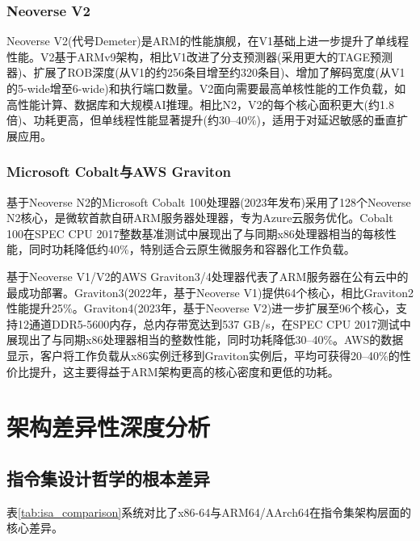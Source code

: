 \documentclass[12pt,a4paper]{IEEEtran}
\begin{document}
\subsubsection{Neoverse V2}

Neoverse V2(代号Demeter)是ARM的性能旗舰，在V1基础上进一步提升了单线程性能。V2基于ARMv9架构，相比V1改进了分支预测器(采用更大的TAGE预测器)、扩展了ROB深度(从V1的约256条目增至约320条目)、增加了解码宽度(从V1的5-wide增至6-wide)和执行端口数量。V2面向需要最高单核性能的工作负载，如高性能计算、数据库和大规模AI推理。相比N2，V2的每个核心面积更大(约1.8倍)、功耗更高，但单线程性能显著提升(约30--40\%)，适用于对延迟敏感的垂直扩展应用。

\subsubsection{Microsoft Cobalt与AWS Graviton}

基于Neoverse N2的Microsoft Cobalt 100处理器(2023年发布)采用了128个Neoverse N2核心，是微软首款自研ARM服务器处理器，专为Azure云服务优化。Cobalt 100在SPEC CPU 2017整数基准测试中展现出了与同期x86处理器相当的每核性能，同时功耗降低约40\%，特别适合云原生微服务和容器化工作负载。

基于Neoverse V1/V2的AWS Graviton3/4处理器代表了ARM服务器在公有云中的最成功部署。Graviton3(2022年，基于Neoverse V1)提供64个核心，相比Graviton2性能提升25\%。Graviton4(2023年，基于Neoverse V2)进一步扩展至96个核心，支持12通道DDR5-5600内存，总内存带宽达到537 GB/s，在SPEC CPU 2017测试中展现出了与同期x86处理器相当的整数性能，同时功耗降低30--40\%\cite{aws2023graviton4}。AWS的数据显示，客户将工作负载从x86实例迁移到Graviton实例后，平均可获得20--40\%的性价比提升，这主要得益于ARM架构更高的核心密度和更低的功耗。

\section{架构差异性深度分析}

\subsection{指令集设计哲学的根本差异}

表\ref{tab:isa_comparison}系统对比了x86-64与ARM64/AArch64在指令集架构层面的核心差异。
\end{document}
